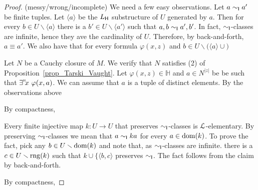 \documentclass[10pt,oneside]{amsproc}
\begin{document}
\begin{proof}(messy/wrong/incomplete)
  We need a few easy observations.
  Let $a\sim_{\sf I}a'$ be finite tuples.
  Let $\langle a\rangle$ be the $L_{\sf H}$ substructure of $U$ generated by $a$.
  Then for every $b\in U\smallsetminus\langle a\rangle$ there is a $b'\in U\smallsetminus\langle a'\rangle$ such that $a,b\sim_{\sf I}a',b'$.
  In fact, $\sim_{\sf I}$-classes are infinite, hence they ave the cardinality of $U$.
  Therefore, by back-and-forth, $a\equiv a'$.
  We also have that for every formula $\varphi(x,z)$ and $b\in U\smallsetminus\big(\langle a\rangle\cup\big)$ 


  Let $N$ be a Cauchy closure of $M$.
  We verify that $N$ satisfies (2) of Proposition~\ref{prop_Tarski_Vaught}.
  Let $\varphi(x,z)\in\mathds{H}$ and $a\in N^{|z|}$ be be such that $\existsH x\ \varphi(x,a)$.
  We can assume that $a$ is a tuple of distinct elements.
  By the observations above
  

  By compactness,


  Every finite injective map $k:U\to U$ that preserves $\sim_{\sf I}$-classes is ${\EuScript L}$-elementary.
  By preserving $\sim_{\sf I}$-classes we mean that $a\sim_{\sf I}ka$ for every $a\in{\rm dom}(k)$.
  To prove the fact, pick any $b\in U\smallsetminus{\rm dom}(k)$ and note that, as $\sim_{\sf I}$-classes are infinite. there is a $c\in U\smallsetminus{\rm rng}(k)$ such that $k\cup\{\langle b,c\rangle$ preserves $\sim_{\sf I}$.
  The fact follows from the claim by back-and-forth.

  

  By compactness,

\end{proof}



\end{document}
